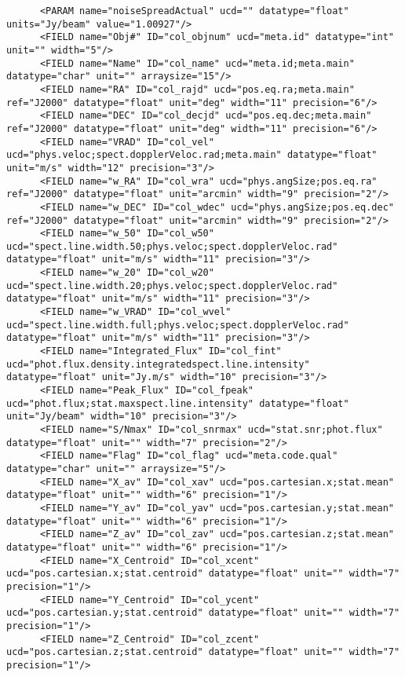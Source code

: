 {\begin{verbatim}
      <PARAM name="noiseSpreadActual" ucd="" datatype="float" units="Jy/beam" value="1.00927"/>
      <FIELD name="Obj#" ID="col_objnum" ucd="meta.id" datatype="int" unit="" width="5"/>
      <FIELD name="Name" ID="col_name" ucd="meta.id;meta.main" datatype="char" unit="" arraysize="15"/>
      <FIELD name="RA" ID="col_rajd" ucd="pos.eq.ra;meta.main" ref="J2000" datatype="float" unit="deg" width="11" precision="6"/>
      <FIELD name="DEC" ID="col_decjd" ucd="pos.eq.dec;meta.main" ref="J2000" datatype="float" unit="deg" width="11" precision="6"/>
      <FIELD name="VRAD" ID="col_vel" ucd="phys.veloc;spect.dopplerVeloc.rad;meta.main" datatype="float" unit="m/s" width="12" precision="3"/>
      <FIELD name="w_RA" ID="col_wra" ucd="phys.angSize;pos.eq.ra" ref="J2000" datatype="float" unit="arcmin" width="9" precision="2"/>
      <FIELD name="w_DEC" ID="col_wdec" ucd="phys.angSize;pos.eq.dec" ref="J2000" datatype="float" unit="arcmin" width="9" precision="2"/>
      <FIELD name="w_50" ID="col_w50" ucd="spect.line.width.50;phys.veloc;spect.dopplerVeloc.rad" datatype="float" unit="m/s" width="11" precision="3"/>
      <FIELD name="w_20" ID="col_w20" ucd="spect.line.width.20;phys.veloc;spect.dopplerVeloc.rad" datatype="float" unit="m/s" width="11" precision="3"/>
      <FIELD name="w_VRAD" ID="col_wvel" ucd="spect.line.width.full;phys.veloc;spect.dopplerVeloc.rad" datatype="float" unit="m/s" width="11" precision="3"/>
      <FIELD name="Integrated_Flux" ID="col_fint" ucd="phot.flux.density.integratedspect.line.intensity" datatype="float" unit="Jy.m/s" width="10" precision="3"/>
      <FIELD name="Peak_Flux" ID="col_fpeak" ucd="phot.flux;stat.maxspect.line.intensity" datatype="float" unit="Jy/beam" width="10" precision="3"/>
      <FIELD name="S/Nmax" ID="col_snrmax" ucd="stat.snr;phot.flux" datatype="float" unit="" width="7" precision="2"/>
      <FIELD name="Flag" ID="col_flag" ucd="meta.code.qual" datatype="char" unit="" arraysize="5"/>
      <FIELD name="X_av" ID="col_xav" ucd="pos.cartesian.x;stat.mean" datatype="float" unit="" width="6" precision="1"/>
      <FIELD name="Y_av" ID="col_yav" ucd="pos.cartesian.y;stat.mean" datatype="float" unit="" width="6" precision="1"/>
      <FIELD name="Z_av" ID="col_zav" ucd="pos.cartesian.z;stat.mean" datatype="float" unit="" width="6" precision="1"/>
      <FIELD name="X_Centroid" ID="col_xcent" ucd="pos.cartesian.x;stat.centroid" datatype="float" unit="" width="7" precision="1"/>
      <FIELD name="Y_Centroid" ID="col_ycent" ucd="pos.cartesian.y;stat.centroid" datatype="float" unit="" width="7" precision="1"/>
      <FIELD name="Z_Centroid" ID="col_zcent" ucd="pos.cartesian.z;stat.centroid" datatype="float" unit="" width="7" precision="1"/>

\end{verbatim}}

